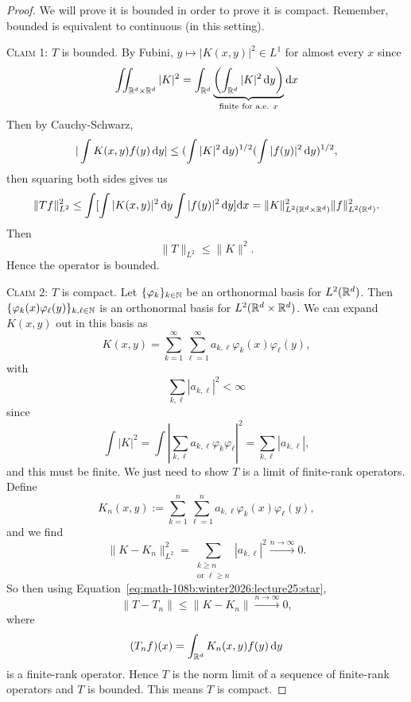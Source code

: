 \begin{proof}
We will prove it is bounded in order to prove it is compact. Remember,
bounded is equivalent to continuous (in this setting).

\textsc{Claim 1:} $T$ is bounded. By Fubini, $y\mapsto|K(x,y)|^{2}\in L^{1}$
for almost every $x$ since
\begin{equation}
\iint_{\mathbb{R}^{d}\times\mathbb{R}^{d}}|K|^{2}=\int_{\mathbb{R}^{d}}\underbrace{\left(\int_{\mathbb{R}^{d}}|K|^{2}\,\mathrm{d} y\right)}_{\text{finite for a.e. }x}\mathrm{d} x
\end{equation}
Then by Cauchy-Schwarz,
\begin{equation}
|\int K(x,y)f(y)\,\mathrm{d} y|\leq(\int|K|^{2}\,\mathrm{d}
y)^{1/2}(\int|f(y)|^{2}\,\mathrm{d} y)^{1/2},
\end{equation}
then squaring both sides gives us
\begin{equation}
\|Tf\|_{L^{2}}^{2}
\leq\int[\int|K(x,y)|^{2}\,\mathrm{d} y\int|f(y)|^{2}\,\mathrm{d} y]\mathrm{d} x
=\|K\|_{L^{2}(\mathbb{R}^{d}\times\mathbb{R}^{d})}^{2}\|f\|_{L^{2}(\mathbb{R}^{d})}^{2}.
\end{equation}
Then
\begin{equation}\label{eq:math-108b:winter2026:lecture25:star}
\|T\|_{L^{2}}\leq\|K\|^{2}.
\end{equation}
Hence the operator is bounded.

\textsc{Claim 2:} $T$ is compact. Let $\{\varphi_{k}\}_{k\in\mathbb{N}}$ be
an orthonormal basis for $L^{2}(\mathbb{R}^{d})$. Then
$\{\varphi_{k}(x)\varphi_{\ell}(y)\}_{k,\ell\in\mathbb{N}}$ is an orthonormal
basis for $L^{2}(\mathbb{R}^{d}\times\mathbb{R}^{d})$. We can expand $K(x,y)$ out in
this basis as
\begin{equation}
K(x,y)=\sum^{\infty}_{k=1}\sum^{\infty}_{\ell=1}a_{k,\ell}\varphi_{k}(x)\varphi_{\ell}(y),
\end{equation}
with
\begin{equation}
\sum_{k,\ell}|a_{k,\ell}|^{2}<\infty
\end{equation}
since
\begin{equation}
\int|K|^{2}=\int|\sum_{k,\ell}a_{k,\ell}\varphi_{k}\varphi_{\ell}|^{2}=\sum_{k,\ell}|a_{k,\ell}|,
\end{equation}
and this must be finite. We just need to show $T$ is a limit of
finite-rank operators. Define
\begin{equation}
K_{n}(x,y):=\sum^{n}_{k=1}\sum^{n}_{\ell=1}a_{k,\ell}\varphi_{k}(x)\varphi_{\ell}(y),
\end{equation}
and we find
\begin{equation}
\|K-K_{n}\|_{L^{2}}^{2}=\sum_{\substack{k\geq n\\\text{or }\ell\geq n}}|a_{k,\ell}|^{2}\xrightarrow{n\to\infty}0.
\end{equation}
So then using Equation~\eqref{eq:math-108b:winter2026:lecture25:star},
\begin{equation}
\|T-T_{n}\|\leq\|K-K_{n}\|\xrightarrow{n\to\infty}0,
\end{equation}
where
\begin{equation}
(T_{n}f)(x) = \int_{\mathbb{R}^{d}}K_{n}(x,y)f(y)\,\mathrm{d} y
\end{equation}
is a finite-rank operator. Hence $T$ is the norm limit of a sequence
of finite-rank operators and $T$ is bounded. This means $T$ is compact.
\end{proof}

